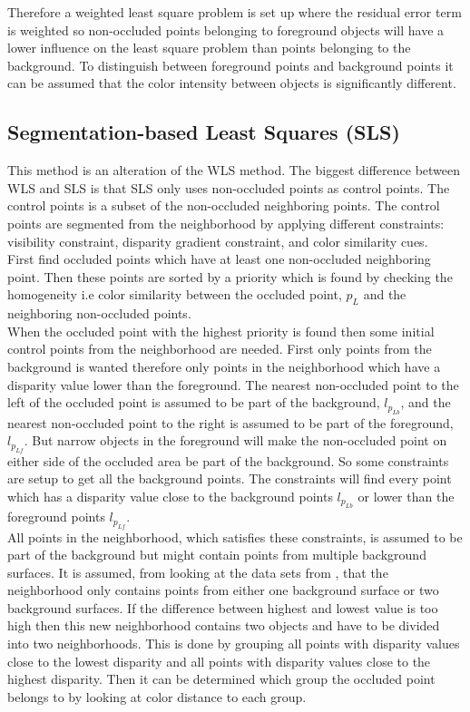 Therefore a weighted least square problem is set up where the residual error term is weighted so non-occluded points belonging to foreground objects will have a lower influence on the least square problem than points belonging to the background. To distinguish between foreground points and background points it can be assumed that the color intensity between objects is significantly different. \\

\subsection{Segmentation-based Least Squares (SLS)}\label{sec:sls}
This method is an alteration of the WLS method. The biggest difference between WLS and SLS is that SLS only uses non-occluded points as control points. The control points is a subset of the non-occluded neighboring points. The control points are segmented from the neighborhood by applying different constraints: visibility constraint, disparity gradient constraint, and color similarity cues.\\

First find occluded points which have at least one non-occluded neighboring point. Then these points are sorted by a priority which is found by checking the homogeneity i.e color similarity between the occluded point, $p_L$ and the neighboring non-occluded points.\\

When the occluded point with the highest priority is found then some initial control points from the neighborhood are needed. First only points from the background is wanted therefore only points in the neighborhood which have a disparity value lower than the foreground. The nearest non-occluded point to the left of the occluded point is assumed to be part of the background, $l_{p_{Lb}}$, and the nearest non-occluded point to the right is assumed to be part of the foreground, $l_{p_{Lf}}$. But narrow objects in the foreground will make the non-occluded point on either side of the occluded area be part of the background. So some constraints are setup to get all the background points. The constraints will find every point which has a disparity value close to the background points $l_{p_{Lb}}$ or lower than the foreground points
$l_{p_{Lf}}$.\\

All points in the neighborhood, which satisfies these constraints, is assumed to be part of the background but might contain points from multiple background surfaces. It is assumed, from looking at the data sets from \cite{middlebury2016}, that the neighborhood only contains points from either one background surface or two background surfaces. If the difference between highest and lowest value is too high then this new neighborhood contains two objects and have to be divided into two neighborhoods. This is done by grouping all points with disparity values close to the lowest disparity and all points with disparity values close to the highest disparity. Then it can be determined which group the occluded point belongs to by looking at color distance to each group. \\

